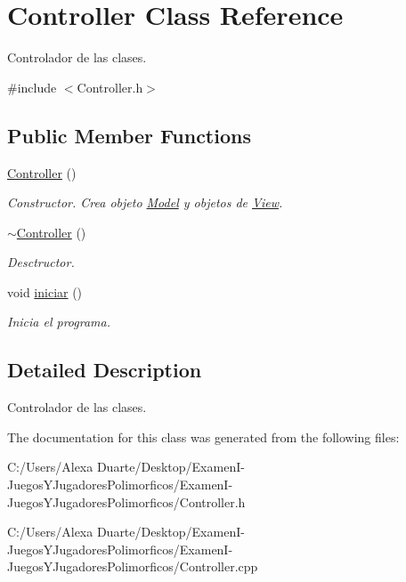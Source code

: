 \hypertarget{class_controller}{}\section{Controller Class Reference}
\label{class_controller}


Controlador de las clases.  




{\ttfamily \#include $<$Controller.\+h$>$}

\subsection*{Public Member Functions}
\begin{DoxyCompactItemize}
\item 
\hyperlink{class_controller_a95c56822d667e94b031451729ce069a9}{Controller} ()\hypertarget{class_controller_a95c56822d667e94b031451729ce069a9}{}\label{class_controller_a95c56822d667e94b031451729ce069a9}

\begin{DoxyCompactList}\small\item\em Constructor. Crea objeto \hyperlink{class_model}{Model} y objetos de \hyperlink{class_view}{View}. \end{DoxyCompactList}\item 
\hyperlink{class_controller_a0ab87934c4f7a266cfdb86e0f36bc1b5}{$\sim$\+Controller} ()\hypertarget{class_controller_a0ab87934c4f7a266cfdb86e0f36bc1b5}{}\label{class_controller_a0ab87934c4f7a266cfdb86e0f36bc1b5}

\begin{DoxyCompactList}\small\item\em Desctructor. \end{DoxyCompactList}\item 
void \hyperlink{class_controller_ab8808d4fd327fb37d6bcf8eba1f2da6c}{iniciar} ()\hypertarget{class_controller_ab8808d4fd327fb37d6bcf8eba1f2da6c}{}\label{class_controller_ab8808d4fd327fb37d6bcf8eba1f2da6c}

\begin{DoxyCompactList}\small\item\em Inicia el programa. \end{DoxyCompactList}\end{DoxyCompactItemize}


\subsection{Detailed Description}
Controlador de las clases. 

The documentation for this class was generated from the following files\+:\begin{DoxyCompactItemize}
\item 
C\+:/\+Users/\+Alexa Duarte/\+Desktop/\+Examen\+I-\/\+Juegos\+Y\+Jugadores\+Polimorficos/\+Examen\+I-\/\+Juegos\+Y\+Jugadores\+Polimorficos/Controller.\+h\item 
C\+:/\+Users/\+Alexa Duarte/\+Desktop/\+Examen\+I-\/\+Juegos\+Y\+Jugadores\+Polimorficos/\+Examen\+I-\/\+Juegos\+Y\+Jugadores\+Polimorficos/Controller.\+cpp\end{DoxyCompactItemize}
